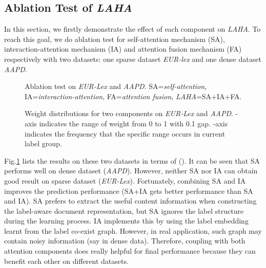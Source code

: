 \documentclass[runningheads]{llncs}
\begin{document}
\subsection{Ablation Test of \textit{LAHA}}
In this section, we firstly
demonstrate the effect of each component on \textit{LAHA}. To reach this goal, we do ablation test for self-attention mechanism (SA), interaction-attention mechanism (IA) and attention fusion mechanism (FA) respectively with two datasets: one sparse dataset \textit{EUR-lex} and one dense dataset \textit{AAPD}.
\vspace{-2mm}
\begin{figure}[h]
	\centering
	\setlength{\abovecaptionskip}{0.cm}
	\setlength{\belowcaptionskip}{-0.cm}
	\caption{Ablation test on \textit{EUR-Lex} and \textit{AAPD}. SA=\textit{self-attention}, IA=\textit{interaction-attention}, FA=\textit{attention fusion}, \textit{LAHA}=SA+IA+FA. }\label{Fig:lablation-test} 
\end{figure}


\begin{figure}[h]\centering
\setlength{\abovecaptionskip}{0.cm}
	\setlength{\belowcaptionskip}{-0.cm}	
	\caption{Weight distributions for two components on \textit{EUR-Lex} and \textit{AAPD}. -axis indicates the range of weight from 0 to 1 with 0.1 gap. -axis indicates the frequency that the specific range occurs in current label group.} \label{Fig:weight-distribution}
\end{figure}

Fig.\ref{Fig:lablation-test} lists the results on these two datasets in terms of  (). It can be seen that SA performs well on dense dataset (\textit{AAPD}). However, neither SA nor IA can obtain good result on sparse dataset (\textit{EUR-Lex}). Fortunately, combining SA and IA improves the prediction performance (SA+IA gets better performance than SA and IA). SA prefers to extract the useful content information when constructing the label-aware document representation, but SA ignores the label structure during the learning process. IA implements this by using the label embedding learnt from the label co-exist graph. However, in real application, such graph may contain noisy information (say in dense data). Therefore, coupling with both attention components does really helpful for final performance because they can benefit each other on different datasets.
\end{document}
